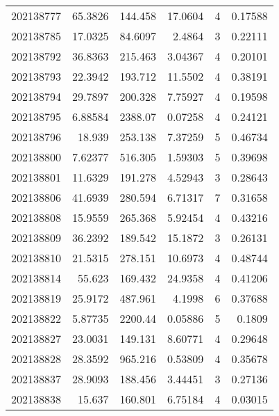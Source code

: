 \begin{tabular}{rrrrrr}
 202138777 &         65.3826  &      144.458  &           17.0604  &           4 & 0.17588 \\
 202138785 &         17.0325  &       84.6097 &            2.4864  &           3 & 0.22111 \\
 202138792 &         36.8363  &      215.463  &            3.04367 &           4 & 0.20101 \\
 202138793 &         22.3942  &      193.712  &           11.5502  &           4 & 0.38191 \\
 202138794 &         29.7897  &      200.328  &            7.75927 &           4 & 0.19598 \\
 202138795 &          6.88584 &     2388.07   &            0.07258 &           4 & 0.24121 \\
 202138796 &         18.939   &      253.138  &            7.37259 &           5 & 0.46734 \\
 202138800 &          7.62377 &      516.305  &            1.59303 &           5 & 0.39698 \\
 202138801 &         11.6329  &      191.278  &            4.52943 &           3 & 0.28643 \\
 202138806 &         41.6939  &      280.594  &            6.71317 &           7 & 0.31658 \\
 202138808 &         15.9559  &      265.368  &            5.92454 &           4 & 0.43216 \\
 202138809 &         36.2392  &      189.542  &           15.1872  &           3 & 0.26131 \\
 202138810 &         21.5315  &      278.151  &           10.6973  &           4 & 0.48744 \\
 202138814 &         55.623   &      169.432  &           24.9358  &           4 & 0.41206 \\
 202138819 &         25.9172  &      487.961  &            4.1998  &           6 & 0.37688 \\
 202138822 &          5.87735 &     2200.44   &            0.05886 &           5 & 0.1809  \\
 202138827 &         23.0031  &      149.131  &            8.60771 &           4 & 0.29648 \\
 202138828 &         28.3592  &      965.216  &            0.53809 &           4 & 0.35678 \\
 202138837 &         28.9093  &      188.456  &            3.44451 &           3 & 0.27136 \\
 202138838 &         15.637   &      160.801  &            6.75184 &           4 & 0.03015 \\

\end{tabular}
